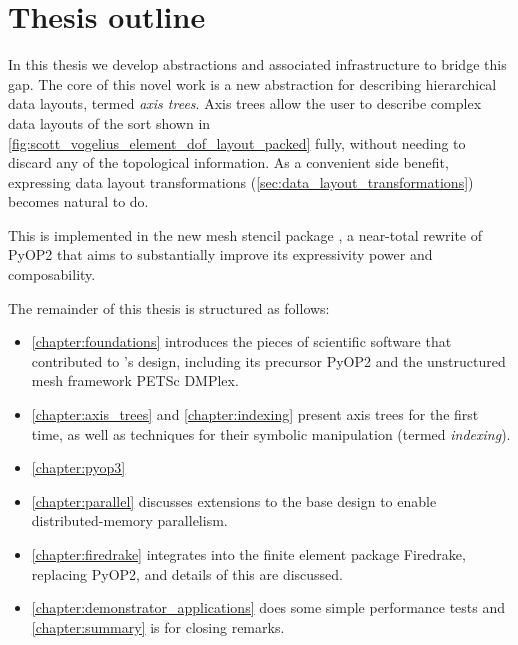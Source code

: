\documentclass[thesis]{subfiles}
\begin{document}

\section{Thesis outline}

In this thesis we develop abstractions and associated infrastructure to bridge this gap.
The core of this novel work is a new abstraction for describing hierarchical data layouts, termed \textit{axis trees}.
Axis trees allow the user to describe complex data layouts of the sort shown in \cref{fig:scott_vogelius_element_dof_layout_packed} fully, without needing to discard any of the topological information.
As a convenient side benefit, expressing data layout transformations (\cref{sec:data_layout_transformations}) becomes natural to do.

This is implemented in the new mesh stencil package , a near-total rewrite of PyOP2 that aims to substantially improve its expressivity power and composability.

The remainder of this thesis is structured as follows:


\begin{itemize}
  \item
    \cref{chapter:foundations} introduces the pieces of scientific software that contributed to 's design, including its precursor PyOP2 and the unstructured mesh framework PETSc DMPlex.
  \item
    \cref{chapter:axis_trees} and \cref{chapter:indexing} present axis trees for the first time, as well as techniques for their symbolic manipulation (termed \textit{indexing}).
  \item
    \cref{chapter:pyop3} 
  \item
    \cref{chapter:parallel} discusses extensions to the base design to enable distributed-memory parallelism.
  \item
    \cref{chapter:firedrake} integrates  into the finite element package Firedrake, replacing PyOP2, and details of this are discussed.
  \item
    \cref{chapter:demonstrator_applications} does some simple performance tests and \cref{chapter:summary} is for closing remarks.
\end{itemize}
\end{document}
